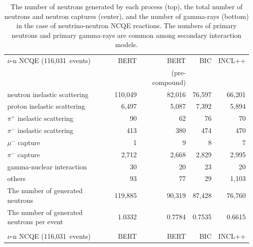 \begin{table}[h]
	\centering
	\caption[The number of neutrons generated by each process, the total number of neutrons and neutron captures, and the number of gamma-rays in the case of neutrino-neutron NCQE reactions]{
	The number of neutrons generated by each process (top), the total number of neutrons and neutron captures (center), and the number of gamma-rays (bottom) in the case of neutrino-neutron NCQE reactions.
	The numbers of primary neutrons and primary gamma-rays are common among secondary interaction models.
	}\label{Others_tab:pre_gamma_nuncqe_n}
	\vs
	\begin{tabular}{lrrrr} \hline \hline
		$\nu$-n NCQE (116,031~events)                       &    BERT &           BERT &     BIC &  INCL++ \\
		                                                    &         & (pre-compound) &         &         \\ \hline
		neutron inelastic scattering                        & 110,049 &         82,016 &  76,597 &  66,201 \\
		proton inelastic scattering                         &   6,497 &          5,087 &   7,392 &   5,894 \\
		$\pi^{+}$ inelastic scattering                      &      90 &             62 &      76 &      70 \\
		$\pi^{-}$ inelastic scattering                      &     413 &            380 &     474 &     470 \\
		$\mu^{-}$ capture                                   &       1 &              9 &       8 &       7 \\
		$\pi^{-}$ capture                                   &   2,712 &          2,668 &   2,829 &   2,995 \\
		gamma-nuclear interaction                           &      30 &             20 &      23 &      20 \\
		others                                              &      93 &             77 &      29 &   1,103 \\ \hline
		The number of generated neutrons                    & 119,885 &         90,319 &  87,428 &  76,760 \\ \hline
		The number of generated neutrons per event          &  1.0332 &         0.7784 &  0.7535 &  0.6615 \\ \hline \hline
		&&& \\ \hline \hline
		$\nu$-n NCQE (116,031~events)                       &    BERT &           BERT &     BIC &  INCL++ \\

\end{tabular}
\end{table}
